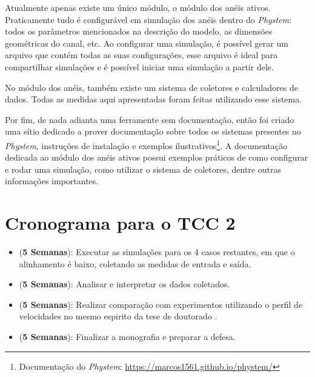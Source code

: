 \documentclass{article}
\theoremstyle{definition}
\begin{document}
Atualmente apenas existe um único módulo, o módulo dos anéis ativos. Praticamente tudo é configurável em simulação dos anéis dentro do \textit{Phystem}: todos os parâmetros mencionados na descrição do modelo, as dimensões geométricas do canal, etc. Ao configurar uma simulação, é possível gerar um arquivo que contém todas as suas configurações, esse arquivo é ideal para compartilhar simulações e é possível iniciar uma simulação a partir dele.

No módulo dos anéis, também existe um sistema de coletores e calculadores de dados. Todas as medidas aqui apresentadas foram feitas utilizando esse sistema.

Por fim, de nada adianta uma ferramente sem documentação, então foi criado uma sítio dedicado a prover documentação sobre todos os sistemas presentes no \textit{Phystem}, instruções de instalação e exemplos ilustrativos\footnote{Documentação do \textit{Phystem}: \href{https://marcos1561.github.io/phystem/}{https://marcos1561.github.io/phystem/}}. A documentação dedicada ao módulo dos anéis ativos possui exemplos práticos de como configurar e rodar uma simulação, como utilizar o sistema de coletores, dentre outras informações importantes.

\section{Cronograma para o TCC 2}
\begin{itemize}
    \item (\textbf{5 Semanas}): Executar as simulações para os 4 casos restantes, em que o alinhamento é baixo, coletando as medidas de entrada e saída.
    \item (\textbf{5 Semanas}): Analisar e interpretar os dados coletados.
    \item (\textbf{5 Semanas}): Realizar comparação com experimentos utilizando o perfil de velocidades no mesmo espirito da tese de doutorado \cite{shourick_modelisation_2024}.
    \item (\textbf{5 Semanas}): Finalizar a monografia e preparar a defesa.
\end{itemize}



%
\end{document}
